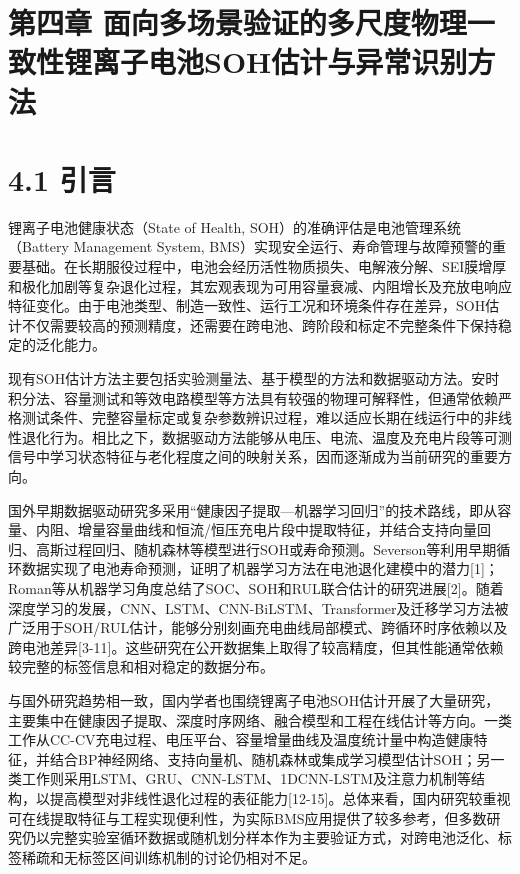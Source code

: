 \documentclass[12pt, a4paper]{ctexart}
\begin{document}
\section{第四章 面向多场景验证的多尺度物理一致性锂离子电池SOH估计与异常识别方法}


\section{4.1 引言}

锂离子电池健康状态（State of Health, SOH）的准确评估是电池管理系统（Battery Management System, BMS）实现安全运行、寿命管理与故障预警的重要基础。在长期服役过程中，电池会经历活性物质损失、电解液分解、SEI膜增厚和极化加剧等复杂退化过程，其宏观表现为可用容量衰减、内阻增长及充放电响应特征变化。由于电池类型、制造一致性、运行工况和环境条件存在差异，SOH估计不仅需要较高的预测精度，还需要在跨电池、跨阶段和标定不完整条件下保持稳定的泛化能力。


现有SOH估计方法主要包括实验测量法、基于模型的方法和数据驱动方法。安时积分法、容量测试和等效电路模型等方法具有较强的物理可解释性，但通常依赖严格测试条件、完整容量标定或复杂参数辨识过程，难以适应长期在线运行中的非线性退化行为。相比之下，数据驱动方法能够从电压、电流、温度及充电片段等可测信号中学习状态特征与老化程度之间的映射关系，因而逐渐成为当前研究的重要方向。


国外早期数据驱动研究多采用“健康因子提取—机器学习回归”的技术路线，即从容量、内阻、增量容量曲线和恒流/恒压充电片段中提取特征，并结合支持向量回归、高斯过程回归、随机森林等模型进行SOH或寿命预测。Severson等利用早期循环数据实现了电池寿命预测，证明了机器学习方法在电池退化建模中的潜力[1]；Roman等从机器学习角度总结了SOC、SOH和RUL联合估计的研究进展[2]。随着深度学习的发展，CNN、LSTM、CNN-BiLSTM、Transformer及迁移学习方法被广泛用于SOH/RUL估计，能够分别刻画充电曲线局部模式、跨循环时序依赖以及跨电池差异[3-11]。这些研究在公开数据集上取得了较高精度，但其性能通常依赖较完整的标签信息和相对稳定的数据分布。


与国外研究趋势相一致，国内学者也围绕锂离子电池SOH估计开展了大量研究，主要集中在健康因子提取、深度时序网络、融合模型和工程在线估计等方向。一类工作从CC-CV充电过程、电压平台、容量增量曲线及温度统计量中构造健康特征，并结合BP神经网络、支持向量机、随机森林或集成学习模型估计SOH；另一类工作则采用LSTM、GRU、CNN-LSTM、1DCNN-LSTM及注意力机制等结构，以提高模型对非线性退化过程的表征能力[12-15]。总体来看，国内研究较重视可在线提取特征与工程实现便利性，为实际BMS应用提供了较多参考，但多数研究仍以完整实验室循环数据或随机划分样本作为主要验证方式，对跨电池泛化、标签稀疏和无标签区间训练机制的讨论仍相对不足。
\end{document}

